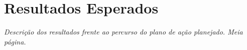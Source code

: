 \section{Resultados Esperados}

\textit{Descrição dos resultados frente ao percurso do plano de ação planejado. Meia página.}
